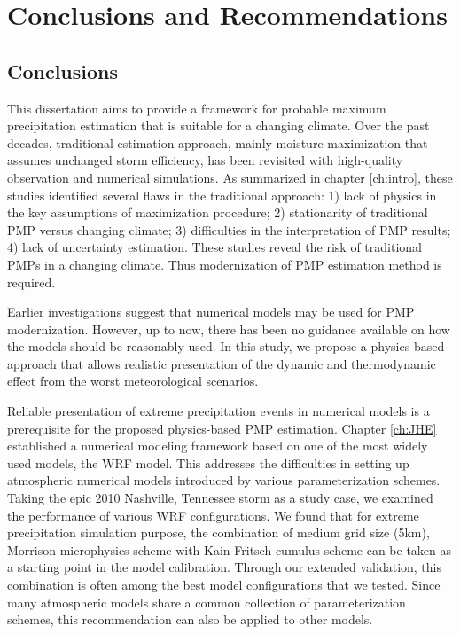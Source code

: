 \chapter {Conclusions and Recommendations}
\label{ch:con}

\section {Conclusions}

This dissertation aims to provide a framework for probable maximum precipitation estimation that is suitable for a changing climate. Over the past decades, traditional estimation approach, mainly moisture maximization that assumes unchanged storm efficiency, has been revisited with high-quality observation and numerical simulations. As summarized in chapter \ref{ch:intro}, these studies identified several flaws in the traditional approach: 1) lack of physics in the key assumptions of maximization procedure; 2) stationarity of traditional PMP versus changing climate; 3) difficulties in the interpretation of PMP results; 4) lack of uncertainty estimation. These studies reveal the risk of traditional PMPs in a changing climate. Thus modernization of PMP estimation method is required.

Earlier investigations suggest that numerical models may be used for PMP modernization. However, up to now, there has been no guidance available on how the models should be reasonably used. In this study, we propose a physics-based approach that allows realistic presentation of the dynamic and thermodynamic effect from the worst meteorological scenarios.

Reliable presentation of extreme precipitation events in numerical models is a prerequisite for the proposed physics-based PMP estimation. Chapter \ref{ch:JHE} established a numerical modeling framework based on one of the most widely used models, the WRF model. This addresses the difficulties in setting up atmospheric numerical models introduced by various parameterization schemes. Taking the epic 2010 Nashville, Tennessee storm as a study case, we examined the performance of various WRF configurations. We found that for extreme precipitation simulation purpose, the combination of medium grid size (5km), Morrison microphysics scheme with Kain-Fritsch cumulus scheme can be taken as a starting point in the model calibration. Through our extended validation, this combination is often among the best model configurations that we tested. Since many atmospheric models share a common collection of parameterization schemes, this recommendation can also be applied to other models.


